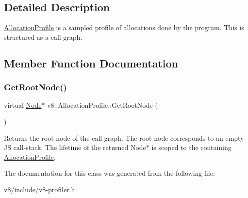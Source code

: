 \subsection{Detailed Description}
\mbox{\hyperlink{classv8_1_1AllocationProfile}{Allocation\+Profile}} is a sampled profile of allocations done by the program. This is structured as a call-\/graph. 

\subsection{Member Function Documentation}
\mbox{\label{classv8_1_1AllocationProfile_afea045dae30df5477088e2f0b7edb6c4}} 
\subsubsection{\texorpdfstring{Get\+Root\+Node()}{GetRootNode()}}
{\footnotesize\ttfamily virtual \mbox{\hyperlink{structv8_1_1AllocationProfile_1_1Node}{Node}}$\ast$ v8\+::\+Allocation\+Profile\+::\+Get\+Root\+Node (\begin{DoxyParamCaption}{ }\end{DoxyParamCaption})\hspace{0.3cm}{\ttfamily [pure virtual]}}

Returns the root node of the call-\/graph. The root node corresponds to an empty JS call-\/stack. The lifetime of the returned Node$\ast$ is scoped to the containing \mbox{\hyperlink{classv8_1_1AllocationProfile}{Allocation\+Profile}}. 

The documentation for this class was generated from the following file\+:\begin{DoxyCompactItemize}
\item 
v8/include/v8-\/profiler.\+h\end{DoxyCompactItemize}
